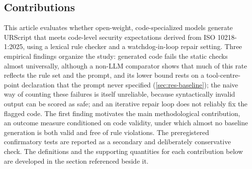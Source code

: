 \documentclass{ieeeaccess}
\begin{document}
\subsection{Contributions}\label{sec:contribution}
This article evaluates whether open-weight, code-specialized models generate
URScript that meets code-level security expectations derived from ISO 10218-1:2025,
using a lexical rule checker and a watchdog-in-loop repair setting. Three empirical
findings organize the study: generated code fails the static checks almost
universally, although a non-LLM comparator shows that much of this rate reflects the rule
set and the prompt, and its lower bound rests on a tool-centre-point declaration that the
prompt never specified (\ref{sec:res-baseline}); the naive way of counting these failures is itself unreliable,
because syntactically invalid output can be scored as safe; and an iterative repair
loop does not reliably fix the flagged code. The first finding motivates the main
methodological contribution, an outcome measure conditioned on code validity, under
which almost no baseline generation is both valid and free of rule violations. The
preregistered confirmatory tests are reported as a secondary and deliberately
conservative check. The definitions and the supporting quantities for each
contribution below are developed in the section referenced beside it.
\end{document}
